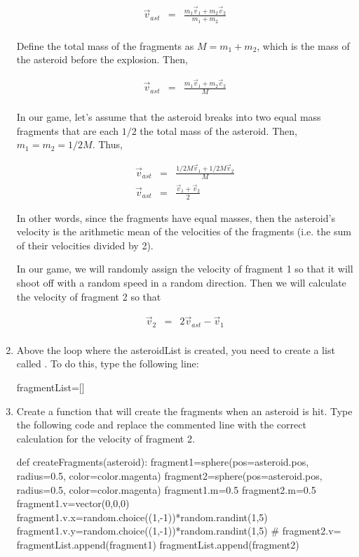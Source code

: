 \begin{enumerate}
\begin{eqnarray*}
	\vec{v}_{ast} & = & \frac{m_1\vec{v}_1+m_2\vec{v}_2}{m_1+m_2} \\
\end{eqnarray*}

Define the total mass of the fragments as $M=m_1+m_2$, which is the mass of the asteroid before the explosion. Then,

\begin{eqnarray*}
	\vec{v}_{ast} & = & \frac{m_1\vec{v}_1+m_2\vec{v}_2}{M} \\
\end{eqnarray*}

In our game, let's assume that the asteroid breaks into two equal mass fragments that are each $1/2$ the total mass of the asteroid. Then, $m_1=m_2=1/2M$. Thus,

\begin{eqnarray*}
	\vec{v}_{ast} & = & \frac{1/2M\vec{v}_1+1/2M\vec{v}_2}{M} \\
	\vec{v}_{ast} & = &  \frac{\vec{v}_1+\vec{v}_2}{2}
\end{eqnarray*}

In other words, since the fragments have equal masses, then the asteroid's velocity is the arithmetic mean of the velocities of the fragments (i.e. the sum of their velocities divided by 2). 

In our game, we will randomly assign the velocity of fragment 1 so that it will shoot off with a random speed in a random direction. Then we will calculate the velocity of fragment 2 so that

\begin{eqnarray*}
	\vec{v}_{2} & = & 2\vec{v}_{ast}-\vec{v}_1\\
\end{eqnarray*}

\item Above the  loop where the asteroidList is created, you need to create a list called . To do this, type the following line:

\begin{myvpython}
fragmentList=[]
\end{myvpython}

\item Create a function that will create the fragments when an asteroid is hit. Type the following code and replace the commented line with the correct calculation for the velocity of fragment 2.

\begin{myvpython}
def createFragments(asteroid):
    fragment1=sphere(pos=asteroid.pos, radius=0.5, color=color.magenta)
    fragment2=sphere(pos=asteroid.pos, radius=0.5, color=color.magenta)
    fragment1.m=0.5
    fragment2.m=0.5
    fragment1.v=vector(0,0,0)
    fragment1.v.x=random.choice((1,-1))*random.randint(1,5)
    fragment1.v.y=random.choice((1,-1))*random.randint(1,5)
#    fragment2.v=
    fragmentList.append(fragment1)
    fragmentList.append(fragment2)
\end{myvpython}


\end{enumerate}
